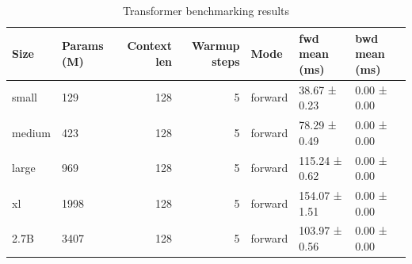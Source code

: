 \begin{table}
\caption{Transformer benchmarking results}
\label{tab:benchmarks}
\begin{tabular}{llrrlll}
\toprule
Size & Params (M) & Context len & Warmup steps & Mode & fwd mean (ms) & bwd mean (ms) \\
\midrule
small & 129 & 128 & 5 & forward & 38.67 ± 0.23 & 0.00 ± 0.00 \\
medium & 423 & 128 & 5 & forward & 78.29 ± 0.49 & 0.00 ± 0.00 \\
large & 969 & 128 & 5 & forward & 115.24 ± 0.62 & 0.00 ± 0.00 \\
xl & 1998 & 128 & 5 & forward & 154.07 ± 1.51 & 0.00 ± 0.00 \\
2.7B & 3407 & 128 & 5 & forward & 103.97 ± 0.56 & 0.00 ± 0.00 \\
\bottomrule
\end{tabular}
\end{table}
